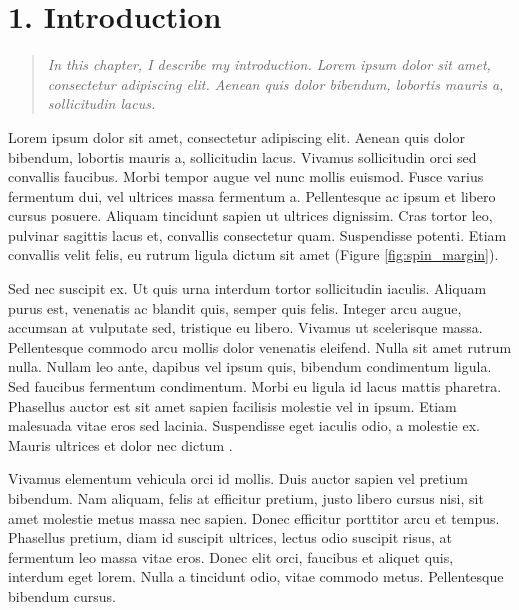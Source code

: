 \chapter{1. Introduction}

\begin{quote}
\textit{In this chapter, I describe my introduction. Lorem ipsum dolor sit amet, consectetur adipiscing elit. Aenean quis dolor bibendum, lobortis mauris a, sollicitudin lacus.} \newline
\end{quote}

Lorem ipsum dolor sit amet, consectetur adipiscing elit. Aenean quis dolor bibendum, lobortis mauris a, sollicitudin lacus. Vivamus sollicitudin orci sed convallis faucibus. Morbi tempor augue vel nunc mollis euismod. Fusce varius fermentum dui, vel ultrices massa fermentum a. Pellentesque ac ipsum et libero cursus posuere. Aliquam tincidunt sapien ut ultrices dignissim. Cras tortor leo, pulvinar sagittis lacus et, convallis consectetur quam. Suspendisse potenti. Etiam convallis velit felis, eu rutrum ligula dictum sit amet (Figure \ref{fig:spin_margin}).


Sed nec suscipit ex. Ut quis urna interdum tortor sollicitudin iaculis. Aliquam purus est, venenatis ac blandit quis, semper quis felis. Integer arcu augue, accumsan at vulputate sed, tristique eu libero. Vivamus ut scelerisque massa. Pellentesque commodo arcu mollis dolor venenatis eleifend. Nulla sit amet rutrum nulla. Nullam leo ante, dapibus vel ipsum quis, bibendum condimentum ligula. Sed faucibus fermentum condimentum. Morbi eu ligula id lacus mattis pharetra. Phasellus auctor est sit amet sapien facilisis molestie vel in ipsum. Etiam malesuada vitae eros sed lacinia. Suspendisse eget iaculis odio, a molestie ex. Mauris ultrices et dolor nec dictum \cite{tseng_dis_spin}.

Vivamus elementum vehicula orci id mollis. Duis auctor sapien vel pretium bibendum. Nam aliquam, felis at efficitur pretium, justo libero cursus nisi, sit amet molestie metus massa nec sapien. Donec efficitur porttitor arcu et tempus. Phasellus pretium, diam id suscipit ultrices, lectus odio suscipit risus, at fermentum leo massa vitae eros. Donec elit orci, faucibus et aliquet quis, interdum eget lorem. Nulla a tincidunt odio, vitae commodo metus. Pellentesque bibendum cursus.

